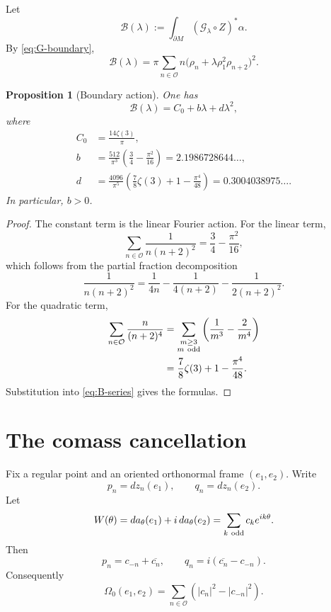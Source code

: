 \documentclass[11pt]{article}
\newtheorem{proposition}[theorem]{Proposition}
\begin{document}
Let
\[
        \mathcal B(\lambda)
        :=
        \int_{\partial M}
        (\mathcal G_\lambda\circ Z)^*\alpha.
\]
By \eqref{eq:G-boundary},
\begin{equation}\label{eq:B-series}
 \mathcal B(\lambda)
 =
 \pi\sum_{n\in\mathcal O}
 n\bigl(\rho_n+\lambda\rho_1^2\rho_{n+2}\bigr)^2.
\end{equation}

\begin{proposition}[Boundary action]\label{prop:B}
One has
\begin{equation}\label{eq:Bclosed}
 \boxed{
 \mathcal B(\lambda)
 =
 C_0+b\lambda+d\lambda^2,}
\end{equation}
where
\begin{align}
 C_0&=\frac{14\zeta(3)}{\pi},
 \label{eq:C0}\\
 b&=
 \frac{512}{\pi^3}
 \left(\frac34-\frac{\pi^2}{16}\right)
 =
 2.1986728644\ldots,
 \label{eq:b}\\
 d&=
 \frac{4096}{\pi^5}
 \left(
 \frac78\zeta(3)+1-\frac{\pi^4}{48}
 \right)
 =
 0.3004038975\ldots.
 \label{eq:d}
\end{align}
In particular, $b>0$.
\end{proposition}

\begin{proof}
The constant term is the linear Fourier action.  For the linear term,
\[
 \sum_{n\in\mathcal O}\frac1{n(n+2)^2}
 =
 \frac34-\frac{\pi^2}{16},
\]
which follows from the partial fraction decomposition
\[
 \frac1{n(n+2)^2}
 =
 \frac1{4n}-\frac1{4(n+2)}-\frac1{2(n+2)^2}.
\]
For the quadratic term,
\[
\begin{aligned}
 \sum_{n\in\mathcal O}\frac{n}{(n+2)^4}
 &=
 \sum_{\substack{m\ge3\\m\ {\rm odd}}}
 \left(\frac1{m^3}-\frac2{m^4}\right)\\
 &=
 \frac78\zeta(3)+1-\frac{\pi^4}{48}.
\end{aligned}
\]
Substitution into \eqref{eq:B-series} gives the formulas.
\end{proof}

\section{The comass cancellation}

Fix a regular point and an oriented orthonormal frame $(e_1,e_2)$.  Write
\[
 p_n=dz_n(e_1),\qquad q_n=dz_n(e_2).
\]
Let
\[
 W(\theta)
 =da_\theta(e_1)+i\,da_\theta(e_2)
 =\sum_{k\ {\rm odd}}c_ke^{ik\theta}.
\]
Then
\begin{equation}\label{eq:pq-c}
 p_n=c_{-n}+\overline{c_n},
 \qquad
 q_n=i(\overline{c_n}-c_{-n}).
\end{equation}
Consequently
\[
        \Omega_0(e_1,e_2)
        =
        \sum_{n\in\mathcal O}
        (|c_n|^2-|c_{-n}|^2).
\]
\end{document}
